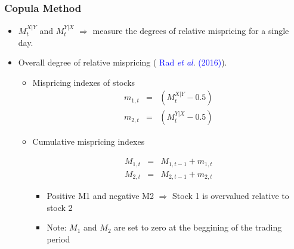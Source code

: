 \documentclass[pdf,10pt,xcolor=dvipsnames,hide notes]{beamer}
\begin{document}
\begin{frame}[label=frame4f2]
	\frametitle{Copula Method}
	
	
	\begin{itemize}
		\item<1> $M_{t}^{X\left\vert Y\right. }$ and $%
		M_{t}^{Y\left\vert X\right. }$ $\Rightarrow$ measure the degrees of relative mispricing for a single day.
		
	\end{itemize} 

		
		\pause
		\vspace{0.3cm}
		
	\begin{itemize}
		\item<2> Overall degree of relative mispricing ( \textcolor{blue}{Rad \emph{et al}}. \textcolor{blue}{(2016)}).
		
		\vspace{0.2cm}
		
		\begin{itemize}
			\item Mispricing indexes of stocks
			\begin{eqnarray*}
				m_{1,t} &=& \left(M_{t}^{X\left\vert Y\right. }-0.5\right)  \\
				m_{2,t} &=& \left( M_{t}^{Y\left\vert X\right. }-0.5\right) 
			\end{eqnarray*}
		
		\vspace{0.2cm}
		
			 \item Cumulative mispricing indexes 
			 			 
			 \begin{eqnarray*}
			 	M_{1,t} &=&M_{1,t-1}+m_{1,t} \\
			 	M_{2,t} &=&M_{2,t-1}+m_{2,t}
			 \end{eqnarray*}
		 
		 \begin{itemize}
		 	\item Positive M1 and negative M2 $\Rightarrow$ Stock 1 is overvalued relative to stock 2
		 	\item Note: $M_{1}$ and $M_{2}$ are set to zero at the beggining of the trading period
		 \end{itemize}
		 
		\end{itemize}
	
	\end{itemize}
	
\end{frame}
\end{document}
